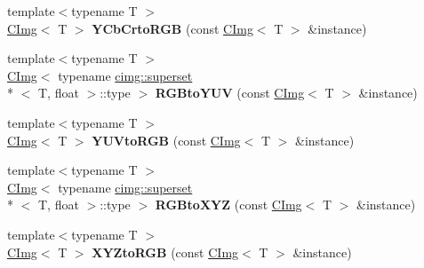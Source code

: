 \begin{DoxyCompactItemize}
\item 
\hypertarget{namespacecimg__library_a5de2c11c63975be8a05c458e5fe9a579}{{\footnotesize template$<$typename T $>$ }\\\hyperlink{structcimg__library_1_1_c_img}{C\-Img}$<$ T $>$ {\bfseries Y\-Cb\-Crto\-R\-G\-B} (const \hyperlink{structcimg__library_1_1_c_img}{C\-Img}$<$ T $>$ \&instance)}\label{namespacecimg__library_a5de2c11c63975be8a05c458e5fe9a579}

\item 
\hypertarget{namespacecimg__library_a3e0edc08fccc97ac3d9bbf81b7aff47c}{{\footnotesize template$<$typename T $>$ }\\\hyperlink{structcimg__library_1_1_c_img}{C\-Img}$<$ typename \hyperlink{structcimg__library_1_1cimg_1_1superset}{cimg\-::superset}\\*
$<$ T, float $>$\-::type $>$ {\bfseries R\-G\-Bto\-Y\-U\-V} (const \hyperlink{structcimg__library_1_1_c_img}{C\-Img}$<$ T $>$ \&instance)}\label{namespacecimg__library_a3e0edc08fccc97ac3d9bbf81b7aff47c}

\item 
\hypertarget{namespacecimg__library_aaf5f952e902ac3556f3c5cc718007841}{{\footnotesize template$<$typename T $>$ }\\\hyperlink{structcimg__library_1_1_c_img}{C\-Img}$<$ T $>$ {\bfseries Y\-U\-Vto\-R\-G\-B} (const \hyperlink{structcimg__library_1_1_c_img}{C\-Img}$<$ T $>$ \&instance)}\label{namespacecimg__library_aaf5f952e902ac3556f3c5cc718007841}

\item 
\hypertarget{namespacecimg__library_a46e4bf909e3678f026c23df2cb897f16}{{\footnotesize template$<$typename T $>$ }\\\hyperlink{structcimg__library_1_1_c_img}{C\-Img}$<$ typename \hyperlink{structcimg__library_1_1cimg_1_1superset}{cimg\-::superset}\\*
$<$ T, float $>$\-::type $>$ {\bfseries R\-G\-Bto\-X\-Y\-Z} (const \hyperlink{structcimg__library_1_1_c_img}{C\-Img}$<$ T $>$ \&instance)}\label{namespacecimg__library_a46e4bf909e3678f026c23df2cb897f16}

\item 
\hypertarget{namespacecimg__library_a08b8983d2080a344711bfe37c79d8fab}{{\footnotesize template$<$typename T $>$ }\\\hyperlink{structcimg__library_1_1_c_img}{C\-Img}$<$ T $>$ {\bfseries X\-Y\-Zto\-R\-G\-B} (const \hyperlink{structcimg__library_1_1_c_img}{C\-Img}$<$ T $>$ \&instance)}\label{namespacecimg__library_a08b8983d2080a344711bfe37c79d8fab}


\end{DoxyCompactItemize}
